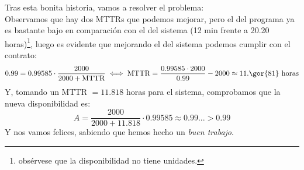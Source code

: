 \begin{problem}[6]
Tras esta bonita historia, vamos a resolver el problema:\\
Observamos que hay dos MTTRs que podemos mejorar, pero el del programa ya es bastante bajo en comparación con el del sistema (12 min frente a 20.20 horas)\footnote{obsérvese que la disponibilidad no tiene unidades.}, luego es evidente que mejorando el del sistema podemos cumplir con el contrato:
\[ 0.99 = 0.99585 \cdot \frac{2000}{2000+\text{MTTR}} \iff \text{MTTR} = \frac{0.99585 \cdot 2000}{0.99} - 2000 \approx 11.\gor{81} \text{ horas}\]
Y, tomando un MTTR $=11.818$ horas para el sistema, comprobamos que la nueva disponibilidad es:
\[ A = \frac{2000}{2000+11.818} \cdot 0.99585 \approx 0.99... > 0.99 \]
Y nos vamos felices, sabiendo que hemos hecho un \textit{buen trabajo}.
\end{problem}

